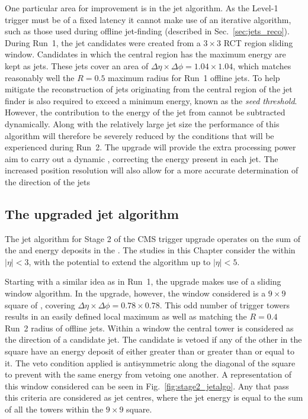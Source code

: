 One particular area for improvement is in the jet algorithm.  As the
Level-1 trigger must be of a fixed latency it cannot make use of an
iterative algorithm, such as those used during offline jet-finding
(described in Sec.~\ref{sec:jets_reco}).  During Run~1, the jet
candidates were created from a $3\times3$ RCT region sliding window.
Candidates in which the central region has the maximum energy are kept
as jets. These jets cover an area of $\Delta\eta\times\Delta\phi =
1.04 \times 1.04$, which matches reasonably well the $R=0.5$ maximum
radius for Run~1 offline jets. To help mitigate the reconstruction of jets
originating from \PU the central region of the jet finder is also
required to exceed a minimum energy, known as the \emph{seed
threshold}. However, the contribution to the energy of the jet from
\PU cannot be subtracted dynamically. Along with the relatively large jet size the
performance of this algorithm will therefore be severely reduced by the
conditions that will be experienced during Run~2. The upgrade will
provide the extra processing power aim to carry out a dynamic \PUS,
correcting the energy present in each jet. The increased position
resolution will also allow for a more accurate determination of the
direction of the jets

\subsection{The upgraded jet algorithm}
\label{sec:stage2_jetalgo}

The jet algorithm for Stage 2 of the CMS trigger upgrade operates on
the sum of the \ECAL and \HCAL energy deposits in the \TT. The studies
in this Chapter consider the \TT within $|\eta|<3$, with the potential
to extend the algorithm up to $|\eta|<5$. 

Starting with a similar idea as in Run~1, the upgrade makes use of a
sliding window algorithm. In the upgrade, however, the window
considered is a $9\times9$ square of \TT, covering
$\Delta\eta\times\Delta\phi = 0.78 \times 0.78$. This odd number of
trigger towers results in an easily defined local maximum as well as
matching the $R=0.4$ Run~2 radius of offline jets. Within a window the
central tower is considered as the direction of a candidate jet. The
candidate is vetoed if any of the other \TT in the square have an
energy deposit of either greater than or greater than or equal to it.
The veto condition applied is antisymmetric along the diagonal of the
square to prevent \TT with the same energy from vetoing one another. A
representation of this window considered can be seen in
Fig.~\ref{fig:stage2_jetalgo}.  Any \TT that pass this criteria are
considered as jet centres, where the jet energy is equal to the sum of
all the towers within the $9\times9$ square.


